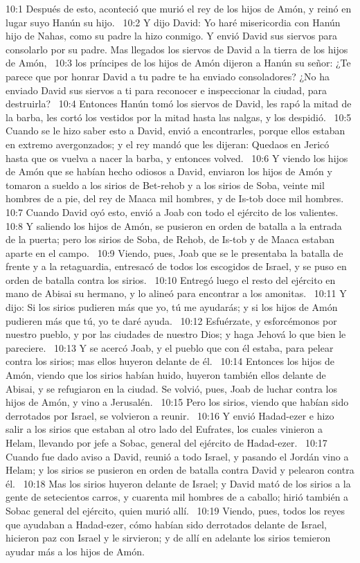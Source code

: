 10:1 Después de esto, aconteció que murió el rey de los hijos de Amón, y reinó en lugar suyo Hanún su hijo.  
10:2 Y dijo David: Yo haré misericordia con Hanún hijo de Nahas, como su padre la hizo conmigo. Y envió David sus siervos para consolarlo por su padre. Mas llegados los siervos de David a la tierra de los hijos de Amón,  
10:3 los príncipes de los hijos de Amón dijeron a Hanún su señor: ¿Te parece que por honrar David a tu padre te ha enviado consoladores? ¿No ha enviado David sus siervos a ti para reconocer e inspeccionar la ciudad, para destruirla?  
10:4 Entonces Hanún tomó los siervos de David, les rapó la mitad de la barba, les cortó los vestidos por la mitad hasta las nalgas, y los despidió.  
10:5 Cuando se le hizo saber esto a David, envió a encontrarles, porque ellos estaban en extremo avergonzados; y el rey mandó que les dijeran: Quedaos en Jericó hasta que os vuelva a nacer la barba, y entonces volved.  
10:6 Y viendo los hijos de Amón que se habían hecho odiosos a David, enviaron los hijos de Amón y tomaron a sueldo a los sirios de Bet-rehob y a los sirios de Soba, veinte mil hombres de a pie, del rey de Maaca mil hombres, y de Is-tob doce mil hombres.  
10:7 Cuando David oyó esto, envió a Joab con todo el ejército de los valientes.  
10:8 Y saliendo los hijos de Amón, se pusieron en orden de batalla a la entrada de la puerta; pero los sirios de Soba, de Rehob, de Is-tob y de Maaca estaban aparte en el campo.  
10:9 Viendo, pues, Joab que se le presentaba la batalla de frente y a la retaguardia, entresacó de todos los escogidos de Israel, y se puso en orden de batalla contra los sirios.  
10:10 Entregó luego el resto del ejército en mano de Abisai su hermano, y lo alineó para encontrar a los amonitas.  
10:11 Y dijo: Si los sirios pudieren más que yo, tú me ayudarás; y si los hijos de Amón pudieren más que tú, yo te daré ayuda.  
10:12 Esfuérzate, y esforcémonos por nuestro pueblo, y por las ciudades de nuestro Dios; y haga Jehová lo que bien le pareciere.  
10:13 Y se acercó Joab, y el pueblo que con él estaba, para pelear contra los sirios; mas ellos huyeron delante de él.  
10:14 Entonces los hijos de Amón, viendo que los sirios habían huido, huyeron también ellos delante de Abisai, y se refugiaron en la ciudad. Se volvió, pues, Joab de luchar contra los hijos de Amón, y vino a Jerusalén.  
10:15 Pero los sirios, viendo que habían sido derrotados por Israel, se volvieron a reunir.  
10:16 Y envió Hadad-ezer e hizo salir a los sirios que estaban al otro lado del Eufrates, los cuales vinieron a Helam, llevando por jefe a Sobac, general del ejército de Hadad-ezer.  
10:17 Cuando fue dado aviso a David, reunió a todo Israel, y pasando el Jordán vino a Helam; y los sirios se pusieron en orden de batalla contra David y pelearon contra él.  
10:18 Mas los sirios huyeron delante de Israel; y David mató de los sirios a la gente de setecientos carros, y cuarenta mil hombres de a caballo; hirió también a Sobac general del ejército, quien murió allí.  
10:19 Viendo, pues, todos los reyes que ayudaban a Hadad-ezer, cómo habían sido derrotados delante de Israel, hicieron paz con Israel y le sirvieron; y de allí en adelante los sirios temieron ayudar más a los hijos de Amón.  

